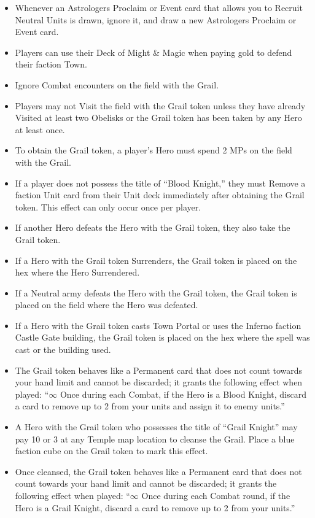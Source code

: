 \begin{multicols*}{2}
\begin{itemize}
    \item Whenever an Astrologers Proclaim or Event card that allows you to Recruit Neutral Units is drawn, ignore it, and draw a new Astrologers Proclaim or Event card.
    \item Players can use their Deck of Might \& Magic when paying gold to defend their faction Town.
    \item Ignore Combat encounters on the field with the Grail.
    \item Players may not Visit the field with the Grail token unless they have already Visited at least two Obelisks or the Grail token has been taken by any Hero at least once.
    \item To obtain the Grail token, a player’s Hero must spend 2 MPs on the field with the Grail.
    \item If a player does not possess the title of “\textcolor{darkcandyapplered}{Blood Knight},” they must Remove a faction Unit card from their Unit deck immediately after obtaining the Grail token. This effect can only occur once per player.
    \item If another Hero defeats the Hero with the Grail token, they also take the Grail token.
    \item If a Hero with the Grail token Surrenders, the Grail token is placed on the hex where the Hero Surrendered.
    \item If a Neutral army defeats the Hero with the Grail token, the Grail token is placed on the field where the Hero was defeated.
    \item If a Hero with the Grail token casts Town Portal or uses the Inferno faction Castle Gate building, the Grail token is placed on the hex where the spell was cast or the building used.
    \item The Grail token behaves like a Permanent card that does not count towards your hand limit and cannot be discarded; it grants the following effect when played: “$\infty$ Once during each Combat, if the Hero is a \textcolor{darkcandyapplered}{Blood Knight}, discard a card to remove up to 2  from your units and assign it to enemy units.”
    \item A Hero with the Grail token who possesses the title of “\textcolor{airforceblue}{Grail Knight}” may pay 10  or 3  at any Temple map location to cleanse the Grail. Place a blue faction cube on the Grail token to mark this effect.
    \item Once cleansed, the Grail token behaves like a Permanent card that does not count towards your hand limit and cannot be discarded; it grants the following effect when played: “$\infty$ Once during each Combat round, if the Hero is a \textcolor{airforceblue}{Grail Knight}, discard a card to remove up to 2  from your units.”
\end{itemize}

\end{multicols*}
